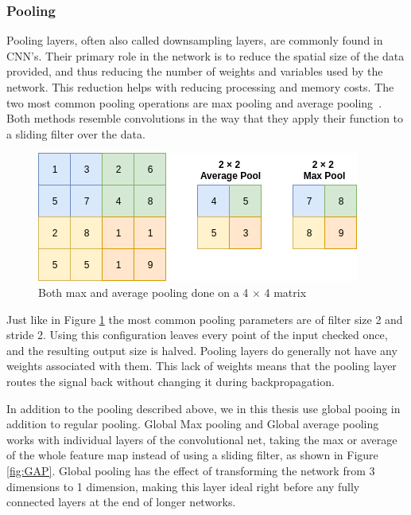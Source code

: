 \subsubsection{Pooling}
\label{cha:pool}
Pooling layers, often also called downsampling layers, are commonly found in CNN's. 
Their primary role in the network is to reduce the spatial size of the data provided, and thus reducing the number of weights and variables used by the network. This reduction helps with reducing processing and memory costs.  
The two most common pooling operations are max pooling and average pooling~\cite{zhou1988computation}. Both methods resemble convolutions in the way that they apply their function to a sliding filter over the data. 
 
\begin{figure}
        \centering
        \includegraphics[scale=0.7]{background/figures/pooling.png}
        \caption{Both max and average pooling done on a 4 $\times$ 4 matrix}
        \label{fig:pooling}
\end{figure}

Just like in Figure \ref{fig:pooling} the most common pooling parameters are of filter size 2 and stride 2. Using this configuration leaves every point of the input checked once, and the resulting output size is halved. 
Pooling layers do generally not have any weights associated with them. This lack of weights means that the pooling layer routes the signal back without changing it during backpropagation.

In addition to the pooling described above, we in this thesis use global pooing in addition to regular pooling. Global Max pooling and Global average pooling works with individual layers of the convolutional net, taking the max or average of the whole feature map instead of using a sliding filter, as shown in Figure \ref{fig:GAP}.
Global pooling has the effect of transforming the network from 3 dimensions to 1 dimension, making this layer ideal right before any fully connected layers at the end of longer networks.

